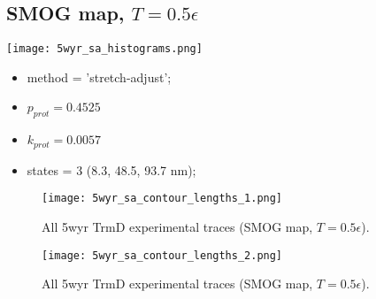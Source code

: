 \subsection{SMOG map, $T=0.5\epsilon$}
\label{subsec:5wyr-sa}
\begin{minipage}[c]{0.7\textwidth}
    \texttt{[image: 5wyr\_sa\_histograms.png]}
\end{minipage}
\hfill
\begin{minipage}[c]{0.45\textwidth}
    \begin{itemize}
        \item method = 'stretch-adjust';
        \item $p_{prot}=0.4525$
        \item $k_{prot}=0.0057$
        \item states = 3 (8.3, 48.5, 93.7 nm);
    \end{itemize}
\end{minipage}

\begin{figure}
    \centering
    \texttt{[image: 5wyr\_sa\_contour\_lengths\_1.png]}
    \caption{All 5wyr TrmD experimental traces (SMOG map, $T=0.5\epsilon$).}
    \label{fig:5wyr-sa-cl1}
\end{figure}

\begin{figure}
    \centering
    \texttt{[image: 5wyr\_sa\_contour\_lengths\_2.png]}
    \caption{All 5wyr TrmD experimental traces (SMOG map, $T=0.5\epsilon$).}
    \label{fig:5wyr-sa-cl2}
\end{figure}

